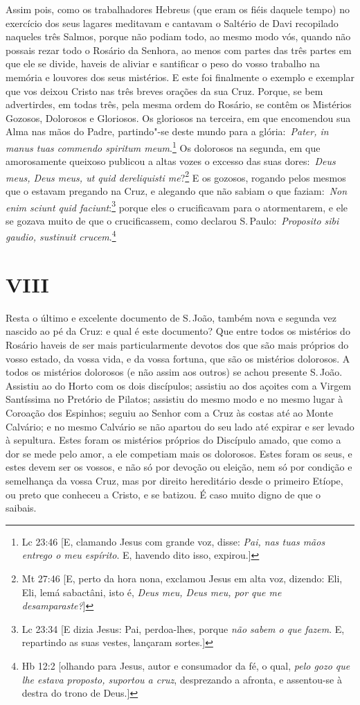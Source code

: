 Assim pois, como os trabalhadores Hebreus (que eram os
fiéis daquele tempo) no exercício dos seus lagares meditavam e cantavam
o Saltério de Davi recopilado naqueles três Salmos, porque não podiam
todo, ao mesmo modo vós, quando não possais rezar todo o Rosário da
Senhora, ao menos com partes das três partes em que ele se divide,
haveis de aliviar e santificar o peso do vosso trabalho na memória e
louvores dos seus mistérios. E este foi finalmente o exemplo e exemplar
que vos deixou Cristo nas três breves orações da sua Cruz. Porque, se
bem advertirdes, em todas três, pela mesma ordem do Rosário, se contêm
os Mistérios Gozosos, Dolorosos e Gloriosos. Os gloriosos na terceira,
em que encomendou sua Alma nas mãos do Padre, partindo"-se deste mundo
para a glória:~\emph{Pater, in manus tuas commendo spiritum
meum}.\footnote{Lc 23:46 [E, clamando Jesus com grande voz, disse: \textit{Pai, nas tuas mãos entrego o meu espírito}. E, havendo dito isso, expirou.]} Os dolorosos na segunda, em que amorosamente
queixoso publicou a altas vozes o excesso das suas dores:~\emph{Deus
meus, Deus meus, ut quid dereliquisti me}?\footnote{Mt 27:46 [E, perto da hora nona, exclamou Jesus em alta voz, dizendo: Eli, Eli, lemá sabactâni, isto
é, \textit{Deus meu, Deus meu, por que me desamparaste?}]} E os
gozosos, rogando pelos mesmos que o estavam pregando na Cruz, e alegando
que não sabiam o que faziam:~\emph{Non enim sciunt quid
faciunt}:\footnote{Lc 23:34 [E dizia Jesus: Pai, perdoa-lhes, porque \textit{não sabem o que fazem}. E, repartindo as suas vestes, lançaram sortes.]} porque eles o crucificavam para o atormentarem, e ele se gozava muito de que o crucificassem, como
declarou S.\,Paulo:~\emph{Proposito sibi gaudio, sustinuit
crucem}.\footnote{Hb 12:2 [olhando para Jesus, autor e consumador da fé, o qual, \textit{pelo gozo que lhe estava proposto, suportou a cruz}, desprezando a afronta, e assentou-se à destra do trono de Deus.]}


\section*{VIII}

Resta o último e excelente documento de S.\,João, também
nova e segunda vez nascido ao pé da Cruz: e qual é este documento? Que
entre todos os mistérios do Rosário haveis de ser mais particularmente
devotos dos que são mais próprios do vosso estado, da vossa vida, e da
vossa fortuna, que são os mistérios dolorosos. A todos os mistérios
dolorosos (e não assim aos outros) se achou presente S.\,João. Assistiu
ao do Horto com os dois discípulos; assistiu ao dos açoites com a Virgem
Santíssima no Pretório de Pilatos; assistiu do mesmo modo e no mesmo
lugar à Coroação dos Espinhos; seguiu ao Senhor com a Cruz às costas até
ao Monte Calvário; e no mesmo Calvário se não apartou do seu lado até
expirar e ser levado à sepultura. Estes foram os mistérios próprios do
Discípulo amado, que como a dor se mede pelo amor, a ele competiam mais
os dolorosos. Estes foram os seus, e estes devem ser os vossos, e não só
por devoção ou eleição, nem só por condição e semelhança da vossa Cruz,
mas por direito hereditário desde o primeiro Etíope, ou preto que
conheceu a Cristo, e se batizou. É caso muito digno de que o saibais.

